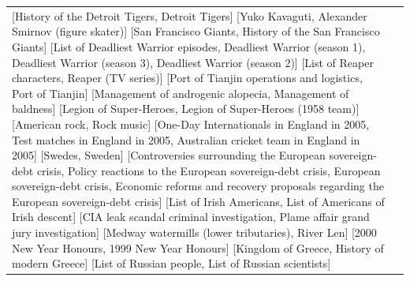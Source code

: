 \documentclass{acm_proc_article-sp}
\begin{document}
\begin{table}
\begin{tabular}{| l | c |}
[History of the Detroit Tigers, Detroit Tigers]
[Yuko Kavaguti, Alexander Smirnov (figure skater)]
[San Francisco Giants, History of the San Francisco Giants]
[List of Deadliest Warrior episodes, Deadliest Warrior (season 1), Deadliest Warrior (season 3), Deadliest Warrior (season 2)]
[List of Reaper characters, Reaper (TV series)]
[Port of Tianjin operations and logistics, Port of Tianjin]
[Management of androgenic alopecia, Management of baldness]
[Legion of Super-Heroes, Legion of Super-Heroes (1958 team)]
[American rock, Rock music]
[One-Day Internationals in England in 2005, Test matches in England in 2005, Australian cricket team in England in 2005]
[Swedes, Sweden]
[Controversies surrounding the European sovereign-debt crisis, Policy reactions to the European sovereign-debt crisis, European sovereign-debt crisis, Economic reforms and recovery proposals regarding the European sovereign-debt crisis]
[List of Irish Americans, List of Americans of Irish descent]
[CIA leak scandal criminal investigation, Plame affair grand jury investigation]
[Medway watermills (lower tributaries), River Len]
[2000 New Year Honours, 1999 New Year Honours]
[Kingdom of Greece, History of modern Greece]
[List of Russian people, List of Russian scientists]

    \hline
\end{tabular}
\end{table}
\end{document}
